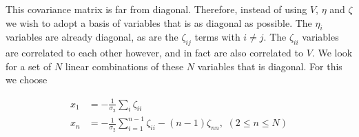 \documentclass[12pt]{article}
\newcommand{\SH}[1]{\textcolor{brown}{[{\bf SH}: #1]}}
\begin{document}


%

This covariance matrix is far from diagonal. Therefore, instead of using $V$, $\eta$ and $\zeta$ we wish to adopt a basis of variables that is as diagonal as possible. The $\eta_i$ variables are already diagonal, as are the $\zeta_{ij}$ terms with $i\neq j$. The $\zeta_{ii}$ variables are correlated to each other however, and in fact are also correlated to $V$. We look for a set of $N$ linear combinations of these $N$ variables that is diagonal. For this we choose

%
\begin{align}
\label{BasisTransform}
x_1 &= -\frac{1}{\sigma_2}\sum_i\zeta_{ii} \nonumber \\
x_n &= -\frac{1}{\sigma_2}\sum_{i=1}^{n-1}\zeta_{ii}-(n-1)\zeta_{nn},\,\, (2\leq n \leq N)
\end{align}
%
\end{document}
